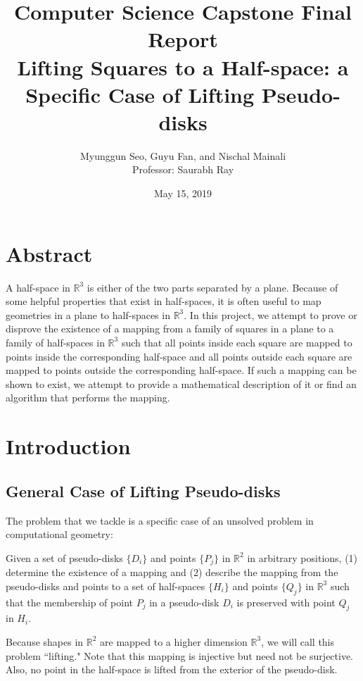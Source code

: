 \documentclass{NSF}
\begin{document}
\author{Myunggun Seo,  Guyu Fan, and Nischal Mainali \\ Professor: Saurabh Ray}
\date{May 15, 2019}
\title{
  {\normalfont Computer Science Capstone Final Report} \\ 
  Lifting Squares to a Half-space: a Specific Case of Lifting Pseudo-disks
}
{\let\newpage\relax\maketitle}

\section{Abstract}
A half-space in $\mathbb{R}^3$ is either of the two parts separated by a plane. Because of some helpful properties that exist in half-spaces, it is often useful to map geometries in a plane to half-spaces in  $\mathbb{R}^3$. In this project, we attempt to prove or disprove the existence of a mapping from a family of squares in a plane to a family of half-spaces in $\mathbb{R}^3$ such that all points inside each square are mapped to points inside the corresponding half-space and all points outside each square are mapped to points outside the corresponding half-space. If such a mapping can be shown to exist, we attempt to provide a mathematical description of it or find an algorithm that performs the mapping.

\tableofcontents

\section{Introduction}
\subsection{General Case of Lifting Pseudo-disks}
The problem that we tackle is a specific case of an unsolved problem in computational geometry: 

Given a set of pseudo-disks $\{D_i\}$ and points $\{P_j\}$ in $\mathbb{R}^2$ in arbitrary positions, (1) determine the existence of a mapping and (2) describe the mapping from the pseudo-disks and points to a set of half-spaces $\{H_i\}$ and points $\{Q_j\}$ in $\mathbb{R}^3$ such that the membership of point $P_j$ in a pseudo-disk $D_i$ is preserved with point $Q_j$ in $H_i$. 

Because shapes in $\mathbb{R}^2$ are mapped to a higher dimension $\mathbb{R}^3$, we will call this problem ``lifting." Note that this mapping is injective but need not be surjective. Also, no point in the half-space is lifted from the exterior of the pseudo-disk.
\end{document}
